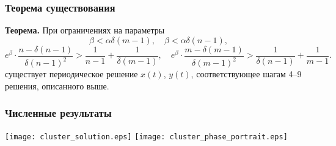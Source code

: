 \begin{frame}
	\frametitle{Теорема существования}
	\textbf{Теорема.} При ограничениях на параметры 
	\small
	\begin{equation*}
		\label{eq:constraint_2}
		\beta < \alpha \delta (m - 1), \quad \beta < \alpha \delta (n - 1),
	\end{equation*}
	\begin{equation*}
		\label{eq:constraint_3}
		e^{\beta} \cdot \dfrac{n - \delta(n - 1)}{\delta (n - 1)^2} > \dfrac{1}{n - 1} + \dfrac{1}{\delta(m - 1)}, \quad
		e^{\beta} \cdot \dfrac{m - \delta(m - 1)}{\delta (m - 1)^2} > \dfrac{1}{\delta(n - 1)} + \dfrac{1}{m - 1}.
	\end{equation*}
	\normalsize
	существует периодическое решение $x(t)$, $y(t)$, соответствующее шагам 4--9 решения, описанного выше.
	
\end{frame}


\begin{frame}
	\frametitle{Численные результаты}
	\texttt{[image: cluster\_solution.eps]}
	\hfill
	\texttt{[image: cluster\_phase\_portrait.eps]}
\end{frame}
